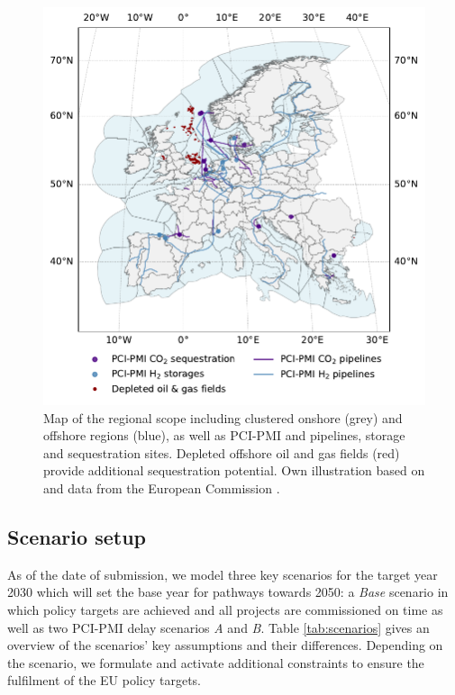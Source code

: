 \documentclass[preprint,12pt]{elsarticle}
\begin{document}
\begin{figure}[htbp]
  \centering
  \includegraphics[width=1\linewidth]{regional_scope_map}
  \caption{Map of the regional scope including clustered onshore (grey) and offshore regions (blue), as well as PCI-PMI  and  pipelines, storage and sequestration sites. Depleted offshore oil and gas fields (red) provide additional  sequestration potential. Own illustration based on \cite{hofmannH2CO2Network2025} and data from the European Commission \cite{europeancommissionPCIPMITransparencyPlatform2024}.}
  \label{fig:regional_scope_map}
\end{figure}

\subsection{Scenario setup}
\label{sec:scenario_setup}

As of the date of submission, we model three key scenarios for the target year 2030 which will set the base year for pathways towards 2050: a \textit{Base} scenario in which policy targets are achieved and all projects are commissioned on time as well as two PCI-PMI delay scenarios \textit{A} and \textit{B}. Table \ref{tab:scenarios} gives an overview of the scenarios' key assumptions and their differences. Depending on the scenario, we formulate and activate additional constraints to ensure the fulfilment of the EU policy targets.
\end{document}
